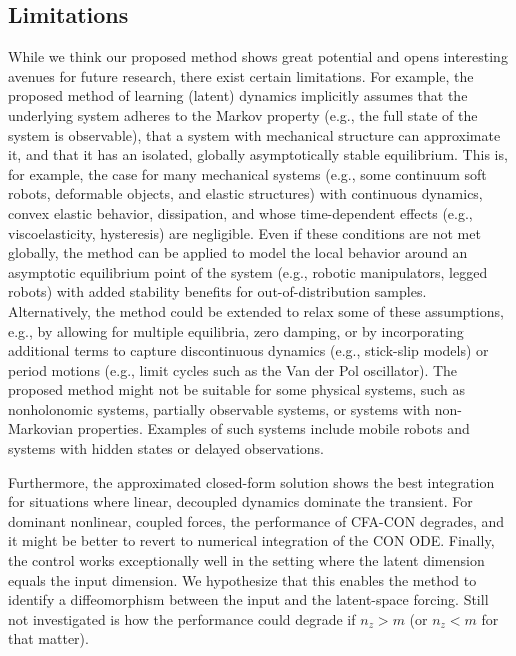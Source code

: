 \subsection{Limitations}
While we think our proposed method shows great potential and opens interesting avenues for future research, there exist certain limitations. For example, the proposed method of learning (latent) dynamics implicitly assumes that the underlying system adheres to the Markov property (e.g., the full state of the system is observable), that a system with mechanical structure can approximate it, and that it has an isolated, globally asymptotically stable equilibrium. This is, for example, the case for many mechanical systems (e.g., some continuum soft robots, deformable objects, and elastic structures) with continuous dynamics, convex elastic behavior, dissipation, and whose time-dependent effects (e.g., viscoelasticity, hysteresis) are negligible. Even if these conditions are not met globally, the method can be applied to model the local behavior around an asymptotic equilibrium point of the system (e.g., robotic manipulators, legged robots) with added stability benefits for out-of-distribution samples. Alternatively, the method could be extended to relax some of these assumptions, e.g., by allowing for multiple equilibria, zero damping, or by incorporating additional terms to capture discontinuous dynamics (e.g., stick-slip models) or period motions (e.g., limit cycles such as the Van der Pol oscillator). The proposed method might not be suitable for some physical systems, such as nonholonomic systems, partially observable systems, or systems with non-Markovian properties. Examples of such systems include mobile robots and systems with hidden states or delayed observations. %

Furthermore, the approximated closed-form solution shows the best integration for situations where linear, decoupled dynamics dominate the transient. For dominant nonlinear, coupled forces, the performance of \gls{CFA-CON} degrades, and it might be better to revert to numerical integration of the \gls{CON} ODE.
Finally, the control works exceptionally well in the setting where the latent dimension equals the input dimension. We hypothesize that this enables the method to identify a diffeomorphism between the input and the latent-space forcing. 
Still not investigated is how the performance could degrade if $n_z > m$ (or $n_z < m$ for that matter).